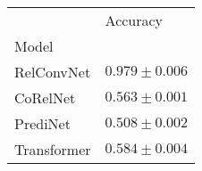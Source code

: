 \begin{tabular}{ll}
\toprule
{} &           Accuracy \\
Model       &                    \\
\midrule
RelConvNet  &  $0.979 \pm 0.006$ \\
CoRelNet    &  $0.563 \pm 0.001$ \\
PrediNet    &  $0.508 \pm 0.002$ \\
Transformer &  $0.584 \pm 0.004$ \\
\bottomrule
\end{tabular}
